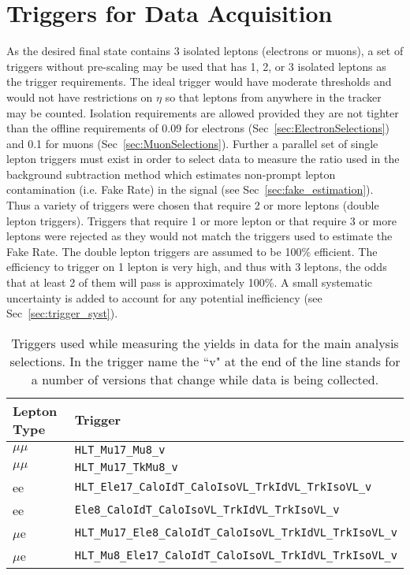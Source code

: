 \section{Triggers for Data Acquisition}
\label{sec:Triggers}
As the desired final state contains 3 isolated leptons (electrons or muons), a set of triggers without pre-scaling may be used that has 1, 2, or 3 isolated leptons as the trigger requirements. The ideal trigger would have moderate \pt thresholds and would not have restrictions on $\eta$ so that leptons from anywhere in the tracker may be counted. Isolation requirements are allowed provided they are not tighter than the offline requirements of 0.09 for electrons (Sec~\ref{sec:ElectronSelections}) and 0.1 for muons (Sec~\ref{sec:MuonSelections}). Further a parallel set of single lepton triggers must exist in order to select data to measure the ratio used in the background subtraction method which estimates non-prompt lepton contamination (i.e. Fake Rate) in the signal (see Sec~\ref{sec:fake_estimation}). \\
Thus a variety of triggers were chosen that require 2 or more leptons (double lepton triggers). Triggers that require 1 or more lepton or that require 3 or more leptons were rejected as they would not match the triggers used to estimate the Fake Rate. The double lepton triggers are assumed to be 100\% efficient. The efficiency to trigger on 1 lepton is very high, and thus with 3 leptons, the odds that at least 2 of them will pass is approximately 100\%. A small systematic uncertainty is added to account for any potential inefficiency (see Sec~\ref{sec:trigger_syst}).
	
\begin{table}[h]
\begin{center}
\caption{\small\label{tab:AnalysisTriggers} Triggers used while measuring the yields in data for the main analysis selections. In the trigger name the ``v" at the end of the line stands for a number of versions that change while data is being collected.}
\begin{tabular}{l|l} \hline \hline
Lepton Type & Trigger  \\ \hline
$\mu\mu$     & \verb=HLT_Mu17_Mu8_v= \\
$\mu \mu$    &\verb=HLT_Mu17_TkMu8_v= \\
ee                   & \verb=HLT_Ele17_CaloIdT_CaloIsoVL_TrkIdVL_TrkIsoVL_v= \\
ee                   & \verb=Ele8_CaloIdT_CaloIsoVL_TrkIdVL_TrkIsoVL_v=\\
$\mu$e          & \verb=HLT_Mu17_Ele8_CaloIdT_CaloIsoVL_TrkIdVL_TrkIsoVL_v= \\
$\mu$e          & \verb=HLT_Mu8_Ele17_CaloIdT_CaloIsoVL_TrkIdVL_TrkIsoVL_v= \\
\hline
\end{tabular}
\end{center}
\end{table}


